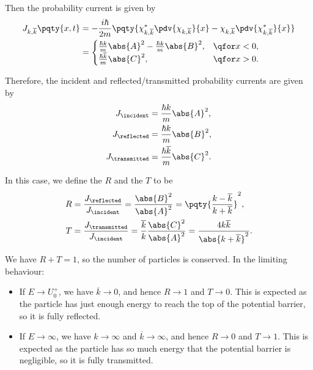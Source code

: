 Then the probability current is given by
\begin{subequations}
    \begin{align}
        J_{k, \overline{k}}\pqty{x, t} &= - \frac{i \hbar}{2 m} \pqty{\chi_{k, \overline{k}}^* \pdv{\chi_{k, \overline{k}}}{x} - \chi_{k, \overline{k}} \pdv{\chi_{k, \overline{k}}^*}{x}} \\
        &= \begin{cases}
            \frac{\hbar k}{m} \abs{A}^2 - \frac{\hbar k}{m} \abs{B}^2, & \qfor x < 0, \\
            \frac{\hbar \overline{k}}{m} \abs{C}^2, & \qfor x > 0.
        \end{cases}
    \end{align}
\end{subequations}

Therefore, the incident and reflected/transmitted probability currents are given by
\begin{subequations}
    \begin{align}
        J_{\incident} &= \frac{\hbar k}{m} \abs{A}^2, \\
        J_{\reflected} &= \frac{\hbar k}{m} \abs{B}^2, \\
        J_{\transmitted} &= \frac{\hbar \overline{k}}{m} \abs{C}^2.
    \end{align}
\end{subequations}

In this case, we define the  \(R\) and the  \(T\) to be
\begin{subequations}
    \begin{align}
        R &= \frac{J_{\reflected}}{J_{\incident}} = \frac{\abs{B}^2}{\abs{A}^2} = \pqty{\frac{k - \overline{k}}{k + \overline{k}}}^2, \\
        T &= \frac{J_{\transmitted}}{J_{\incident}} = \frac{\overline{k}}{k} \frac{\abs{C}^2}{\abs{A}^2} = \frac{4 k \overline{k}}{\abs{k + \overline{k}}^2}.
    \end{align}
\end{subequations}

We have \(R + T = 1\), so the number of particles is conserved. In the limiting behaviour:
\begin{itemize}
    \item If \(E \to U_0^+\), we have \(\overline{k} \to 0\), and hence \(R \to 1\) and \(T \to 0\). This is expected as the particle has just enough energy to reach the top of the potential barrier, so it is fully reflected.
    \item If \(E \to \infty\), we have \(k \to \infty\) and \(\overline{k} \to \infty\), and hence \(R \to 0\) and \(T \to 1\). This is expected as the particle has so much energy that the potential barrier is negligible, so it is fully transmitted.
\end{itemize}


